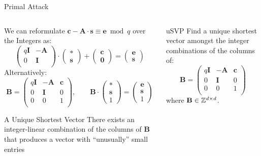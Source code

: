 \documentclass[xcolor=table,10pt,aspectratio=169]{beamer}
\renewcommand{\vec}[1]{\ensuremath{\mathbf{#1}}\xspace}
\providecommand{\mat}[1]{\ensuremath{\vec{#1}}\xspace}
\begin{document}
\begin{frame}[label={sec:orgddf3dd0}]{Primal Attack}
\begin{columns}
\begin{column}[t]{0.7\columnwidth}
We can reformulate \(\vec{c} - \mat{A} \cdot \vec{s} \equiv \vec{e} \bmod q\)  over the Integers as:
\[
    \begin{pmatrix}q\mat{I} & -\mat{A}\\0 & \mat{I}\\\end{pmatrix}
  \cdot \begin{pmatrix}\vec{*}\\\vec{s}\end{pmatrix}
  + \begin{pmatrix}\vec{c}\\\vec{0}\end{pmatrix}
  = \begin{pmatrix}\vec{e}\\\vec{s}\end{pmatrix}
\]
Alternatively:
\[
  \mat{B} = \begin{pmatrix}q\mat{I} & -\mat{A} & \vec{c}\\
  0 & \mat{I} & 0\\
  0 & 0 & 1\\
  \end{pmatrix}
  , \qquad
  \mat{B}
  \cdot \begin{pmatrix}\vec{*}\\\vec{s}\\1\end{pmatrix}
  = \begin{pmatrix}\vec{e}\\\vec{s}\\1\end{pmatrix}
\]

\begin{block}{A Unique Shortest Vector}
There exists an integer-linear combination of the columns of \(\mat{B}\) that produces a vector with “unusually” small entries
\end{block}
\end{column}

\begin{column}[t]{0.3\columnwidth}
\begin{alertblock}{uSVP}
Find a unique shortest vector amongst the integer combinations of the columns of:
\[
  \mat{B} = \begin{pmatrix}
 q\mat{I} & -\mat{A} & \vec{c}\\
 0        & \mat{I}  & 0\\
 0        & 0        & 1\\
  \end{pmatrix}
\]
where \(\mat{B} \in \ZZ^{d \times d}\).
\end{alertblock}
\end{column}
\end{columns}
\end{frame}
\end{document}
